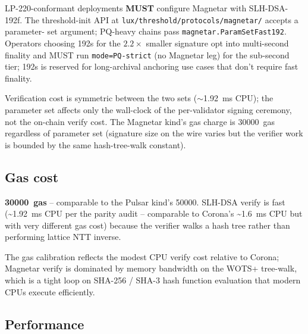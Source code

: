 LP-220-conformant deployments \textbf{MUST} configure Magnetar
with SLH-DSA-192f. The threshold-init API at
\texttt{lux/threshold/protocols/magnetar/} accepts a parameter-
set argument; PQ-heavy chains pass
\texttt{magnetar.ParamSetFast192}. Operators choosing 192s for
the $2.2\times$ smaller signature opt into multi-second finality
and MUST run \texttt{mode=PQ-strict} (no Magnetar leg) for the
sub-second tier; 192s is reserved for long-archival anchoring
use cases that don't require fast finality.

Verification cost is symmetric between the two sets
($\sim$\SI{1.92}{\milli\second} CPU); the parameter set affects
only the wall-clock of the per-validator signing ceremony, not
the on-chain verify cost. The Magnetar kind's gas charge is
\SI{30000}{gas} regardless of parameter set (signature size on
the wire varies but the verifier work is bounded by the same
hash-tree-walk constant).

\subsection{Gas cost}

\textbf{\SI{30000}{gas}} -- comparable to the Pulsar kind's
\SI{50000}{}. SLH-DSA verify is fast (\textasciitilde\SI{1.92}{\milli\second}
CPU per the parity audit -- comparable to Corona's
\textasciitilde\SI{1.6}{\milli\second} CPU but with very
different gas cost) because the verifier walks a hash tree
rather than performing lattice NTT inverse.

The gas calibration reflects the modest CPU verify cost
relative to Corona; Magnetar verify is dominated by memory
bandwidth on the WOTS+ tree-walk, which is a tight loop on
SHA-256 / SHA-3 hash function evaluation that modern CPUs
execute efficiently.

\subsection{Performance}

